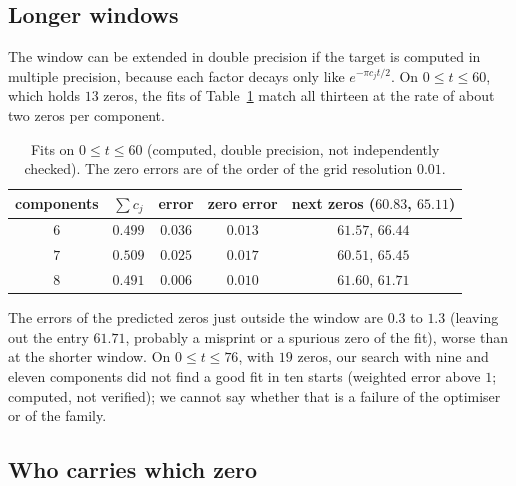 \subsection{Longer windows}\label{ap:sec:long}

The window can be extended in double precision if the target is computed in multiple precision, because each factor decays only like $e^{-\pi c_jt/2}$. On $0\le t\le60$, which holds $13$ zeros, the fits of Table~\ref{ap:tab:long} match all thirteen at the rate of about two zeros per component.
\begin{table}[t]
\centering
\small
\begin{tabular}{ccccc}
\toprule
components & $\sum c_j$ & error & zero error & next zeros ($60.83$, $65.11$)\\
\midrule
$6$ & $0.499$ & $0.036$ & $0.013$ & $61.57$, $66.44$\\
$7$ & $0.509$ & $0.025$ & $0.017$ & $60.51$, $65.45$\\
$8$ & $0.491$ & $0.006$ & $0.010$ & $61.60$, $61.71$\\
\bottomrule
\end{tabular}
\caption{Fits on $0\le t\le60$ (computed, double precision, not independently checked). The zero errors are of the order of the grid resolution $0.01$.}\label{ap:tab:long}
\end{table}
The errors of the predicted zeros just outside the window are $0.3$ to $1.3$ (leaving out the entry $61.71$, probably a misprint or a spurious zero of the fit), worse than at the shorter window. On $0\le t\le76$, with $19$ zeros, our search with nine and eleven components did not find a good fit in ten starts (weighted error above $1$; computed, not verified); we cannot say whether that is a failure of the optimiser or of the family.

\subsection{Who carries which zero}\label{ap:sec:carry}

